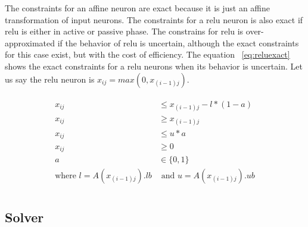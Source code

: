 The constraints for an affine neuron are exact because it is just an affine transformation of input neurons. 
The constraints for a relu neuron is also exact if relu is either in active or passive phase. 
The constrains for relu is over-approximated if the behavior of relu is uncertain, although the exact 
constraints for this case exist, but with the cost of efficiency. The equation ~\ref{eq:reluexact} shows the exact constraints
for a relu neurons when its behavior is uncertain. Let us say the relu neuron is $x_{ij} = max(0,x_{(i-1)j})$. 

\begin{align}
    \label{eq:reluexact}
    \begin{split}
        x_{ij} &\leq x_{(i-1)j} - l*(1-a) \\
        x_{ij} &\geq x_{(i-1)j} \\
        x_{ij} &\leq u*a \\
        x_{ij} &\geq 0 \\
        a &\in \{0,1\} \\ 
        \text{where }l = A(x_{(i-1)j}).lb &\text{ and }u = A(x_{(i-1)j}).ub \\
    \end{split}
\end{align}


\subsection{Solver}


